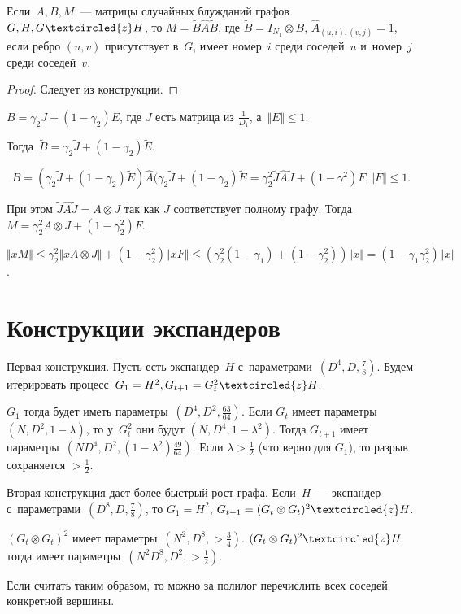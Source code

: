 \documentclass{article}
\begin{document}
\begin{claim}
	Если~$A, B, M$~--- матрицы случайных блужданий графов~$G, H, G \textcircled{z}
	H$, то $M = \widetilde{B} \widehat{A} \widetilde{B}$, где $\widetilde{B} =
	I_{N_1} \otimes B$, $\widehat{A}_{(u, i), (v, j)} = 1$, если ребро $(u, v)$
	присутствует в~$G$, имеет номер~$i$ среди соседей~$u$ и~номер~$j$ среди
	соседей~$v$.
\end{claim}
\begin{proof}
	Следует из конструкции.
\end{proof}

$B = \gamma_2 J + (1 - \gamma_2) E$, где $J$ есть матрица из $\frac{1}{D_1}$,
а~$\Vert E \Vert \le 1$.

Тогда~$\widetilde{B} = \gamma_2 \widetilde{J} + (1 - \gamma_2) \widetilde{E}$.

$$B = (\gamma_2 \widetilde{J} + (1 - \gamma_2) \widetilde{E}) \widehat{A}
(\gamma_2 \widetilde{J} + (1 - \gamma_2) \widetilde{E} = \gamma_2^2
\widetilde{J} \widehat{A} \widetilde{J} + (1 - \gamma^2) F, \Vert F \Vert
\le 1.$$

При этом $\widetilde{J} \widehat{A} \widetilde{J} = A \otimes J$ так как $J$
соответствует полному графу. Тогда $M = \gamma_2^2 A \otimes J + (1 -
\gamma_2^2) F$.

$\Vert xM \Vert \le \gamma_2^2 \Vert x A \otimes J \Vert + (1 -
\gamma_2^2) \Vert xF \Vert \le (\gamma_2^2 (1 - \gamma_1) + (1 - \gamma_2^2))
\Vert x \Vert = (1 - \gamma_1 \gamma_2^2) \Vert x \Vert$.

\section{Конструкции экспандеров}

Первая конструкция. Пусть есть экспандер~$H$
с~параметрами~$(D^4, D, \frac{7}{8})$. Будем итерировать
процесс~$G_1 = H^2, G_{t+1} = G_t^2 \textcircled{z} H$.

$G_1$ тогда будет иметь параметры~$(D^4, D^2, \frac{63}{64})$. Если $G_t$ имеет
параметры $(N, D^2, 1 - \lambda)$, то у~$G_t^2$ они будут $(N, D^4, 1 -
\lambda^2)$. Тогда $G_{t+1}$ имеет параметры~$(ND^4, D^2, (1 - \lambda^2)
\frac{49}{64})$. Если $\lambda > \frac{1}{2}$ (что верно для $G_1$), то разрыв
сохраняется $>\frac{1}{2}$.

Вторая конструкция дает более быстрый рост графа. Если~$H$~--- экспандер
с~параметрами~$(D^8, D, \frac{7}{8})$, то $G_1 = H^2$, $G_{t+1} =
(G_t \otimes G_t)^2 \textcircled{z} H$.

$(G_t \otimes G_t)^2$ имеет параметры~$(N^2, D^8, >\frac{3}{4})$. $(G_t \otimes
G_t)^2 \textcircled{z} H$ тогда имеет параметры~$(N^2 D^8, D^2, >\frac{1}{2})$.

Если считать таким образом, то можно за полилог перечислить всех соседей
конкретной вершины.
\end{document}

